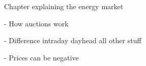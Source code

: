 Chapter explaining the energy market

- How auctions work

- Difference intraday dayhead all other stuff

- Prices can be negative
